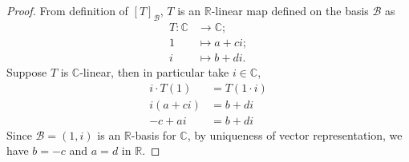 \documentclass{article}
\theoremstyle{definition}
\numberwithin{lemma}{problem}
\numberwithin{equation}{problem}
\newcommand{\R}{\mathbb{R}}
\newcommand{\C}{\mathbb{C}}
\newcommand{\B}{\mathcal{B}}
\begin{document}
\begin{proof}
    From definition of $[T]_\B$, $T$ is an $\R$-linear map defined on the basis $\B$ as
    \begin{align*}
        T: \C &\to \C;      \\
        1 &\mapsto a + ci;  \\
        i &\mapsto b + di.
    \end{align*}
    Suppose $T$ is $\C$-linear, then in particular take $i \in \C$,
    \begin{align*}
        i\cdot T(1) &= T(1\cdot i)  \\
        i(a+ci) &= b + di   \\
        -c + ai &= b + di
    \end{align*}
    Since $\B=(1,i)$ is an $\R$-basis for $\C$, by uniqueness of vector representation,
    we have $b = -c$ and $a = d$ in $\R$.


\end{proof}
\end{document}
